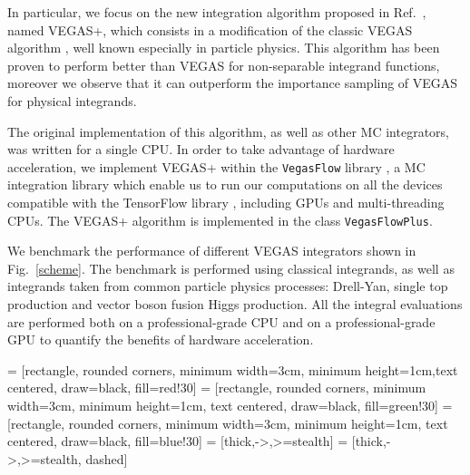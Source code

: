 \documentclass[../main/main.tex]{subfiles}
\begin{document}
In particular, we focus on the new integration algorithm proposed in Ref.~\cite{Lepage:2020tgj}, named VEGAS+, which consists in a modification of the classic VEGAS algorithm \cite{Lepage:1977sw}, well known especially in particle physics. This algorithm has been proven to perform better than VEGAS for non-separable integrand functions, moreover we observe that it can outperform the importance sampling of VEGAS for physical integrands.

The original implementation of this algorithm, as well as other MC integrators, was written for a single CPU. In order to take advantage of hardware acceleration, we implement VEGAS+ within the \texttt{VegasFlow} library \cite{vegasflow_package},  a MC integration library which enable us to run our computations on all the devices compatible with the TensorFlow library \cite{tensorflow2015-whitepaper}, including GPUs and multi-threading CPUs. The VEGAS+ algorithm is implemented in the class \texttt{VegasFlowPlus}.

We benchmark the performance of different VEGAS integrators shown in Fig.~\ref{scheme}.
The benchmark is performed using classical integrands, as well as integrands taken from common particle physics processes: Drell-Yan, single top production and vector boson fusion Higgs production. All the integral evaluations are performed both on a professional-grade CPU and on a professional-grade GPU to quantify the benefits of hardware acceleration.

 = [rectangle, rounded corners, minimum width=3cm, minimum height=1cm,text centered, draw=black, fill=red!30]
 = [rectangle, rounded corners, minimum width=3cm, minimum height=1cm, text centered, draw=black, fill=green!30]
 = [rectangle, rounded corners, minimum width=3cm, minimum height=1cm, text centered, draw=black, fill=blue!30]
 = [thick,->,>=stealth]
 = [thick,->,>=stealth, dashed]
\end{document}
